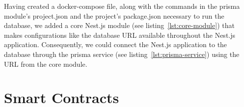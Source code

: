 
Having created a docker-compose file, along with the commands in the prisma module’s project.json and the project’s package.json necessary to run the database, we added a core Nest.js module (see listing~\ref{lst:core-module}) that makes configurations like the database \gls{URL} available throughout the Nest.js application.
Consequently, we could connect the Nest.js application to the database through the prisma service (see listing~\ref{lst:prisma-service}) using the \gls{URL} from the core module.


\section{Smart Contracts}\label{sec:smart-contracts}
















